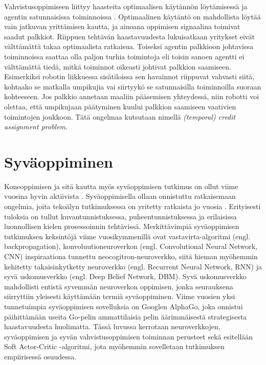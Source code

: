 \documentclass[utf8]{gradu3}
\begin{document}
Vahvistusoppimiseen liittyy haasteita optimaalisen käytännön löytämisessä ja agentin satunnaisissa toiminnoissa \parencite{arulkumaran2017brief}. Optimaalinen käytäntö on mahdollista löytää vain jatkuvan yrittämisen kautta, ja ainoana oppimisen signaalina toimivat saadut palkkiot. Riippuen tehtävän haastavuudesta lukuisatkaan yritykset eivät välttämättä takaa optimaalista ratkaisua. Toiseksi agentin palkkioon johtavissa toiminnoissa saattaa olla paljon turhia toimintoja eli toisin sanoen agentti ei välttämättä tiedä, mitkä toiminnot oikeasti johtivat palkkion saamiseen. Esimerkiksi robotin liikkuessa sisätiloissa sen havainnot riippuvat vahvasti siitä, kohtaako se matkalla umpikujia vai siirtyykö se satunnaisilla toiminnoilla suoraan kohteeseen. Jos palkkio annetaan maaliin pääsemisen yhteydessä, niin robotti voi olettaa, että umpikujaan päätyminen kuului palkkion saamiseen vaativien toimintojen joukkoon. Tätä ongelmaa kutsutaan nimellä \textit{(temporal) credit assignment problem}.

\section{Syväoppiminen}

Koneoppimisen ja sitä kautta myös syväoppimisen tutkimus on ollut viime vuosina hyvin aktiivista \parencite{pouyanfar2018survey}. Syväoppimisella ollaan onnistuttu ratkaisemaan ongelmia, joita tekoälyn tutkimuksessa on yritetty ratkaista jo vuosia \parencite{lecun2015deep,pouyanfar2018survey}. Erityisesti tuloksia on tullut kuvantunnistuksessa, puheentunnistuksessa ja erilaisissa luonnollisen kielen prosessoinnin tehtävissä. Merkittävimpiä syväoppimisen tutkimuksen keksintöjä viime vuosikymmenillä ovat vastavirta-algoritmi (engl. backpropagation), konvoluutioneuroverkon (engl. Convolutional Neural Network, CNN) inspiraationa tunnettu neocogitron-neuroverkko, siitä hieman myöhemmin kehitetty takaisinkytketty neuroverkko (engl. Recurrent Neural Network, RNN) ja syvä uskomusverkko (engl. Deep Belief Network, DBM). Syvä uskomusverkko mahdollisti entistä syvemmän neuroverkon oppimisen, jonka seurauksena siirryttiin yleisesti käyttämään termiä syväoppiminen. Viime vuosien yksi tunnetuimpia syväoppimisen sovelluksia on Googlen AlphaGo, joka onnistui päihittämään useita Go-pelin ammattilaisia pelin äärimmäisestä strategisesta haastavuudesta huolimatta. Tässä luvussa kerrotaan neuroverkkojen, syväoppimisen ja syvän vahvistusoppimisen toiminnan perusteet sekä esitellään Soft Actor-Critic -algoritmi, jota myöhemmin sovelletaan tutkimuksen empiirisessä osuudessa.
\end{document}
